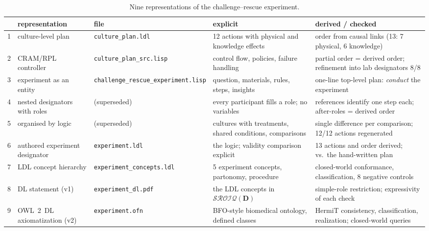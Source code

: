 \documentclass[10pt,a4paper]{article}
\begin{document}
\begin{table}[tbp]\centering\footnotesize
\caption{Nine representations of the challenge--rescue experiment.}\label{tab:evolution}
\begin{tabularx}{\linewidth}{@{}p{0.3cm}p{3.0cm}p{3.7cm}XX@{}}\toprule  & representation & file & explicit & derived / checked \\ \midrule
1 & culture-level plan & \texttt{culture\_\allowbreak{}plan.ldl} & 12 actions with physical and knowledge effects & order from causal links (13: 7 physical, 6 knowledge) \\
2 & CRAM/RPL controller & \texttt{culture\_\allowbreak{}plan\_\allowbreak{}src.lisp} & control flow, policies, failure handling & partial order = derived order; refinement into lab designators 8/8 \\
3 & experiment as an entity & \texttt{challenge\_\allowbreak{}rescue\_\allowbreak{}experiment.lisp} & question, materials, rules, steps, insights & one-line top-level plan: \emph{conduct} the experiment \\
4 & nested designators with roles & (superseded) & every participant fills a role; no variables & references identify one step each; after-roles = derived order \\
5 & organised by logic & (superseded) & cultures with treatments, shared conditions, comparisons & single difference per comparison; 12/12 actions regenerated \\
6 & authored experiment designator & \texttt{experiment.ldl} & the logic; validity comparison explicit & 13 actions and order derived; vs.\ the hand-written plan \\
7 & LDL concept hierarchy & \texttt{experiment\_\allowbreak{}concepts.ldl} & 5 experiment concepts, partonomy, procedure & closed-world conformance, classification, 8 negative controls \\
8 & DL statement (v1) & \texttt{experiment\_\allowbreak{}dl.pdf} & the LDL concepts in $\mathcal{SROIQ}(\mathbf{D})$ & simple-role restriction; expressivity of each check \\
9 & OWL~2~DL axiomatization (v2) & \texttt{experiment.ofn} & BFO-style biomedical ontology, defined classes & HermiT consistency, classification, realization; closed-world queries \\
\bottomrule\end{tabularx}\end{table}
\end{document}
